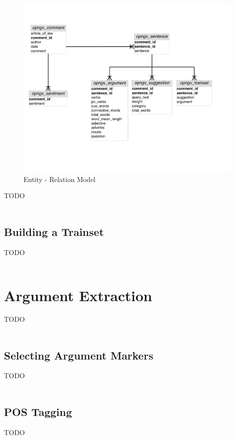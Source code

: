 \begin{figure}[H]
\centering
\includegraphics[width=1.15\linewidth]{figure/ER.pdf}
\caption{Entity - Relation Model}
\end{figure}

TODO\\
\\

\subsection{Building a Trainset}\label{315_ref}
TODO\\
\\


\section{Argument Extraction}\label{32_ref}
TODO\\
\\
\subsection{Selecting Argument Markers}\label{321_ref}
TODO\\
\\
\subsection{POS Tagging}\label{322_ref}
TODO\\
\\
